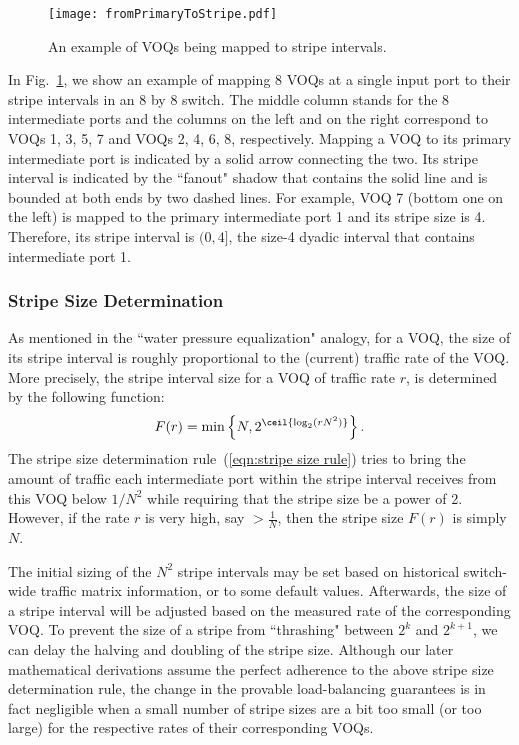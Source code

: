 \begin{figure}[htb]
  \centering
    \texttt{[image: fromPrimaryToStripe.pdf]}
    \caption{An example of VOQs being mapped to stripe intervals.}
\label{fig:stripe-interval-mapping}
\end{figure} 

In Fig.~\ref{fig:stripe-interval-mapping}, we show an example of mapping 8 VOQs at a single input port to their stripe intervals
in an 8 by 8 switch.  The middle column stands for the 8 intermediate ports and the columns
on the left and on the right correspond to VOQs 1, 3, 5, 7 and VOQs 2, 4, 6, 8, respectively.  Mapping a VOQ to 
its primary intermediate port is indicated by a solid arrow connecting the two.  Its stripe interval is indicated by 
the ``fanout" shadow that contains the solid line and is bounded at both ends by two dashed lines.  For example, 
VOQ 7 (bottom one on the left) is mapped to the primary intermediate 
port 1 and its stripe size is 4.  Therefore, its stripe interval is $(0, 4]$, the size-4 dyadic interval that contains intermediate
port 1.







\subsubsection{Stripe Size Determination}
\label{sec:stripe size eq}


As mentioned
in the ``water pressure equalization" analogy, for a VOQ, the size of its stripe interval is 
roughly proportional to the (current) traffic rate of the VOQ.  More precisely, the stripe interval size for
a VOQ of traffic rate $r$, is determined by the following function:
\begin{align}
  \label{eqn:stripe size rule}
F(r) = \min\left\{N, 2^{\ceil{\log_2 (rN^2)}}
  \right\}.
\end{align}
The stripe size determination rule~(\ref{eqn:stripe size rule}) 
tries to bring the amount of traffic each intermediate port within the stripe interval receives from 
this VOQ below $1/N^2$ while requiring that the stripe size 
be a power of 2. 
However, if the rate $r$ is very high, say $>\frac{1}{N}$, then the stripe size $F(r)$ is simply $N$.


The initial sizing of the $N^2$ stripe intervals may be set based on historical switch-wide traffic matrix
information, or to some default values.  
Afterwards,
the size of a stripe interval will be adjusted based on the measured rate of the corresponding VOQ.  
To prevent the size of a stripe from ``thrashing" between $2^k$ and $2^{k+1}$, we can delay the 
halving and doubling of the stripe size.  Although our later mathematical derivations assume the perfect
adherence to the above stripe size determination rule, the change in the provable load-balancing guarantees
is in fact negligible when a small number of stripe sizes are a bit too small (or too large) for the respective rates of 
their corresponding VOQs.




